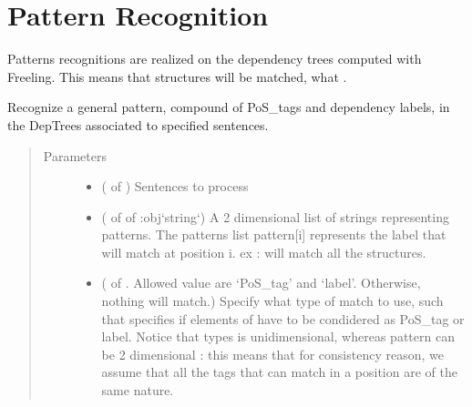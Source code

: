 \documentclass[letterpaper,10pt,english]{sphinxmanual}
\begin{document}
\section{Pattern Recognition}
\label{\detokenize{index:module-loacore.analysis.pattern_recognition}}\label{\detokenize{index:pattern-recognition}}
Patterns recognitions are realized on the dependency trees computed with Freeling. This means that 
structures will be matched, what .

\begin{fulllineitems}
\label{\detokenize{index:loacore.analysis.pattern_recognition.general_pattern_recognition}}
Recognize a general pattern, compound of PoS\_tags and dependency labels, in the DepTrees associated to specified
sentences.
\begin{quote}\begin{description}
\item[{Parameters}] \leavevmode\begin{itemize}
\item {} 
 ( of ) \textendash{} Sentences to process

\item {} 
 ( of  of :obj{}`string{}`) \textendash{} A 2 dimensional list of strings representing patterns. The patterns list pattern{[}i{]} represents the label
that will match at position i. ex :  will match all the
 structures.

\item {} 
 ( of . Allowed value are ‘PoS\_tag’ and ‘label’. Otherwise, nothing will
match.) \textendash{} Specify what type of match to use, such that  specifies if elements of  have to be
condidered as PoS\_tag or label. Notice that types is unidimensional, whereas pattern can be 2 dimensional :
this means that for consistency reason, we assume that all the tags that can match in a position  are of
the same nature.


\end{itemize}
\end{description}
\end{quote}
\end{fulllineitems}
\end{document}
